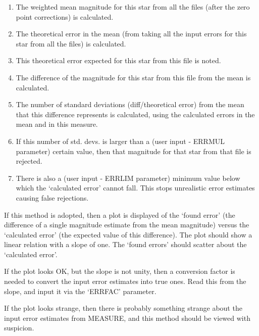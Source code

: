 \begin{small}
{{{               \begin{enumerate}
               \item The weighted mean magnitude for this star from all
                  the files (after the zero point corrections) is
                  calculated.
               \item The theoretical error in the mean (from taking all
                  the input errors for this star from all the files) is
                  calculated.
               \item This theoretical error expected for this star from
                  this file is noted.
               \item The difference of the magnitude for this star from
                  this file from the mean is calculated.
               \item  The number of standard deviations (diff/theoretical
                  error) from the mean that this difference represents
                  is calculated, using the calculated errors in the
                  mean and in this measure.
               \item If this number of std. devs. is larger than a (user
                  input - ERRMUL parameter) certain value, then that
                  magnitude for that
                  star from that file is rejected.
               \item There is also a (user input - ERRLIM parameter)
                  minimum value below which the `calculated error'
                  cannot fall. This stops unrealistic error estimates
                  causing false rejections.
               \end{enumerate}
 
               If this method is adopted, then a plot is
               displayed of the `found error' (the difference of a
               single magnitude estimate from the mean magnitude)
               versus the `calculated error' (the expected value of
               this difference). The plot should show a linear
               relation with a slope of one. The `found errors' should
               scatter about the `calculated error'.
 
               If the plot looks OK, but the slope is not unity, then
               a conversion factor is needed to convert the input
               error estimates into true ones. Read this from the slope,
               and input it via the `ERRFAC' parameter.
 
               If the plot looks strange, then there is probably
               something strange about the input error estimates from
               MEASURE, and this method should be viewed with suspicion.
 
}}}
\end{small}
